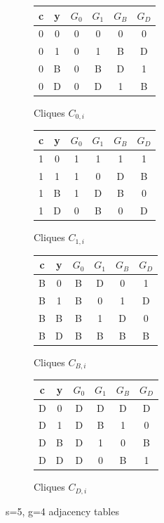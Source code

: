 \documentclass[11pt, oneside]{article} 	%
\begin{document}
\begin{figure}[!htb]
\begin{subfigure}{.25\textwidth}
\begin{tabular}{|| c c || c c c c || } 
 \hline
c & y & $G_0$ & $G_1$ & $G_B$ & $G_D$ \\ [0.5ex] 
 \hline\hline
 0 & 0 & 0 & 0 & 0 & 0 \\
 0 & 1 & 0 & 1 & B & D \\
 0 & B & 0 & B & D & 1 \\
 0 & D & 0 & D & 1 & B \\
 \hline
 \end{tabular}
\caption{Cliques $C_{0,i}$}
\label{fig:cliques4-0}
\end{subfigure}
\begin{subfigure}{.25\textwidth}
\begin{tabular}{|| c c || c c c c || } 
 \hline
c & y & $G_0$ & $G_1$ & $G_B$ & $G_D$ \\ [0.5ex] 
 \hline\hline
 1 & 0 & 1 & 1 & 1 & 1 \\
 1 & 1 & 1 & 0 & D & B \\
 1 & B & 1 & D & B & 0 \\
 1 & D & 0 & B & 0 & D \\
 \hline
 
 \end{tabular}
\caption{Cliques $C_{1,i}$}
\label{fig:cliques4-1}
\end{subfigure}
\begin{subfigure}{.25\textwidth}
\begin{tabular}{|| c c || c c c c || } 
 \hline
c & y & $G_0$ & $G_1$ & $G_B$ & $G_D$ \\ [0.5ex] 
 \hline\hline
 \cellcolor{yellow}B & \cellcolor{yellow}0 & \cellcolor{yellow}B & \cellcolor{yellow}D & \cellcolor{yellow}0 & \cellcolor{yellow}1 \\
 \cellcolor{cyan}B & \cellcolor{cyan}1 & \cellcolor{cyan} B & \cellcolor{cyan}0 & \cellcolor{cyan}1 & \cellcolor{cyan} D \\
 B & B & B & 1 & D & 0 \\
 B & D & B & B & B & B \\
 \hline
 
 \end{tabular}
\caption{Cliques $C_{B,i}$}
\label{fig:cliques4-B}
\end{subfigure}
\begin{subfigure}{.25\textwidth}
\begin{tabular}{|| c c || c c c c || } 
 \hline
c & y & $G_0$ & $G_1$ & $G_B$ & $G_D$ \\ [0.5ex] 
 \hline\hline
 D & 0 & D & D & D & D \\
 D & 1 & D & B & 1 & 0 \\
 D & B & D & 1 & 0 & B \\
 D & D & D & 0 & B & 1 \\
 \hline
 
 \end{tabular}
\caption{Cliques $C_{D,i}$}
\label{fig:cliques4-D}
\end{subfigure}
\caption{s=5, g=4 adjacency tables}
\end{figure}
\end{document}
